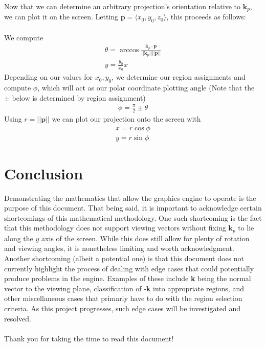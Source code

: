 \documentclass{article}
\begin{document}
Now that we can determine an arbitrary projection's orientation relative to $\textbf{k}_p$, we can plot it on the screen. Letting
$\textbf{p} = \langle x_{0},y_{0},z_{0} \rangle$, this proceeds as follows:
\\\\
We compute
\begin{align*}
\theta = \arccos{\frac{\textbf{k}_p \cdot \textbf{p}}{||\textbf{k}_p|| ||\textbf{p}||}}\\
y = \frac{y_0}{x_0}x
\end{align*}
Depending on our values for $x_0,y_0$, we determine our region assignments and compute $\phi$, which will act as our polar coordinate plotting
angle (Note that the $\pm$ below is determined by region assignment)
\begin{align*}
\phi = \frac{\pi}{2} \pm \theta
\end{align*}
Using $r = ||\textbf{p}||$ we can plot our projection onto the screen with
\begin{align*}
x = r\cos \phi\\
y = r\sin \phi
\end{align*}

\section{Conclusion}
Demonstrating the mathematics that allow the graphics engine to operate is the purpose of this document. That being said, it is important to
acknowledge certain shortcomings of this mathematical methodology. One such shortcoming is the fact that this methodology does not support
viewing vectors without fixing $\textbf{k}_p$ to lie along the $y$ axis of the screen. While this does still allow for plenty of rotation and
viewing angles, it is nonetheless limiting and worth acknowledgment. Another shortcoming (albeit a potential one) is that this document does
not currently highlight the process of dealing with edge cases that could potentially produce problems in the engine. Examples of these include
\textbf{k} being the normal vector to the viewing plane, classification of -\textbf{k} into appropriate regions, and other miscellaneous
cases that primarly have to do with the region selection criteria. As this project progresses, such edge cases will be investigated and resolved.
\\\\
Thank you for taking the time to read this document!
\end{document}
